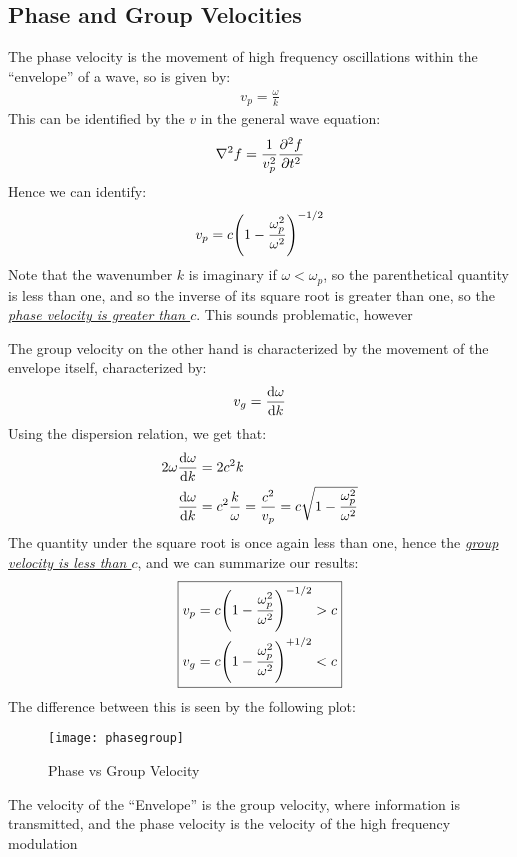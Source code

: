 \subsection{Phase and Group Velocities}
The phase velocity is the movement of high frequency oscillations within the ``envelope'' of a wave, so is given by:
\begin{align*}
  v_p=\frac{\omega}{k}
\end{align*}
This can be identified by the $v$ in the general wave equation:
\begin{align*}
  \laplacian{f}=\frac1{v^2_p}\pdv[2]{f}{t}
\end{align*}
Hence we can identify:
\begin{align*}
  v_p=c\qty(1-\frac{\omega_p^2}{\omega^2})^{-1/2}
\end{align*}
Note that the wavenumber $k$ is imaginary if $\omega<\omega_p$, so the parenthetical quantity is less than one, and so the inverse of its square root is greater than one, so the \underline{\emph{phase velocity is greater than $c$}}. This sounds problematic, however

The group velocity on the other hand is characterized by the movement of the envelope itself, characterized by:
\begin{align*}
  v_g=\dv{\omega}{k}
\end{align*}
Using the dispersion relation, we get that:
\begin{align*}
  2\omega\dv{\omega}{k}&=2c^2k\\
  \dv{\omega}{k}&=c^2\frac{k}{\omega}=\frac{c^2}{v_p}=
  c\sqrt{1-\frac{\omega_p^2}{\omega^2}}
\end{align*}
The quantity under the square root is once again less than one, hence the \underline{\emph{group velocity is less than $c$}}, and we can summarize our results:
\begin{equation}
  \boxed{\begin{aligned}
      v_p&=c\qty(1-\frac{\omega_p^2}{\omega^2})^{-1/2}>c\\
      v_g&=c\qty(1-\frac{\omega_p^2}{\omega^2})^{+1/2}<c
  \end{aligned}}
\end{equation}
The difference between this is seen by the following plot:
\begin{figure}[H]
  \centering
  \texttt{[image: phasegroup]}
  \caption{Phase vs Group Velocity}
\end{figure}
The velocity of the ``Envelope'' is the group velocity, where information is transmitted, and the phase velocity is the velocity of the high frequency modulation

